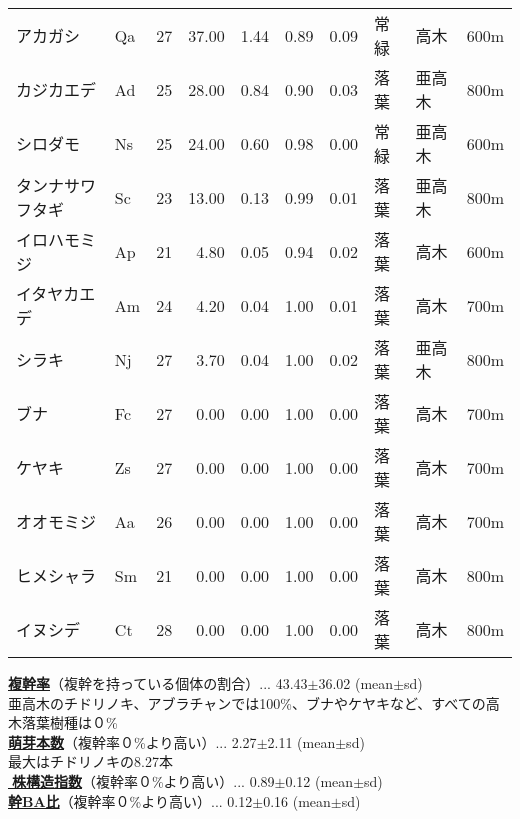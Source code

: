 \documentclass[a0, 36pt, plainboxedsections]{sciposter} %
\renewcommand{\baselinestretch}{1.2}
\begin{document}
\begin{multicols}{2}
\begin{wraptable}{r}{14em}
{\begin{tabular}{llrrrrrlll}
アカガシ & Qa &  27 & 37.00 & 1.44 & 0.89 & 0.09 & 常緑 & 高木 & 600m \\ 
カジカエデ & Ad &  25 & 28.00 & 0.84 & 0.90 & 0.03 & 落葉 & 亜高木 & 800m \\ 
シロダモ & Ns &  25 & 24.00 & 0.60 & 0.98 & 0.00 & 常緑 & 亜高木 & 600m \\ 
タンナサワフタギ & Sc &  23 & 13.00 & 0.13 & 0.99 & 0.01 & 落葉 & 亜高木 & 800m \\ 
イロハモミジ & Ap &  21 & 4.80 & 0.05 & 0.94 & 0.02 & 落葉 & 高木 & 600m \\ 
イタヤカエデ & Am &  24 & 4.20 & 0.04 & 1.00 & 0.01 & 落葉 & 高木 & 700m \\ 
シラキ & Nj &  27 & 3.70 & 0.04 & 1.00 & 0.02 & 落葉 & 亜高木 & 800m \\ 
\rowcolor{Blue2!30}ブナ & Fc &  27 & 0.00 & 0.00 & 1.00 & 0.00 & 落葉 & 高木 & 700m \\ 
\rowcolor{Blue2!30}ケヤキ & Zs &  27 & 0.00 & 0.00 & 1.00 & 0.00 & 落葉 & 高木 & 700m \\ 
\rowcolor{Blue2!30}オオモミジ & Aa &  26 & 0.00 & 0.00 & 1.00 & 0.00 & 落葉 & 高木 & 700m \\ 
\rowcolor{Blue2!30}ヒメシャラ & Sm &  21 & 0.00 & 0.00 & 1.00 & 0.00 & 落葉 & 高木 & 800m \\ 
\rowcolor{Blue2!30}イヌシデ & Ct &  28 & 0.00 & 0.00 & 1.00 & 0.00 & 落葉 & 高木 & 800m \\ 
   \hline
\end{tabular}}
\end{wraptable}

\textbf{\underline{複幹率}}{\footnotesize（複幹を持っている個体の割合）}... 43.43$\pm$36.02 (mean$\pm$sd)\\
{\footnotesize 亜高木のチドリノキ、アブラチャンでは100\%、ブナやケヤキなど、すべての高木落葉樹種は０\%}\\
\textbf{\underline{萌芽本数}}{\footnotesize（複幹率０\%より高い）}... 2.27$\pm$2.11 (mean$\pm$sd)\\
{\footnotesize 最大はチドリノキの8.27本}\\
\textbf{\underline{株構造指数}}{\footnotesize（複幹率０\%より高い）}... 0.89$\pm$0.12 (mean$\pm$sd)\\
\textbf{\underline{幹BA比}}{\footnotesize（複幹率０\%より高い）}... 0.12$\pm$0.16 (mean$\pm$sd)

\vspace{1em}
\renewcommand{\baselinestretch}{0.8}
\begin{mdframed}[style=subsection.frame]
  \huge\textbf{}
\end{mdframed}
\renewcommand{\baselinestretch}{1.2}


\end{multicols}
\end{document}
